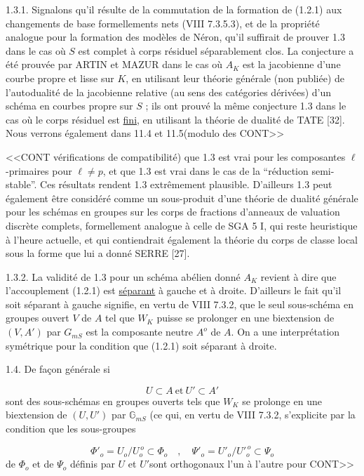 1.3.1. Signalons qu'il résulte de la commutation de la formation de (1.2.1) aux changements de base formellements nets (VIII 7.3.5.3), et de la propriété analogue pour la formation des modèles de Néron, qu'il suffirait de prouver 1.3 dans le cas où $S$ est complet à corps résiduel séparablement clos. La conjecture a été prouvée par ARTIN et MAZUR dans le cas où $A_K$ est la jacobienne d'une courbe propre et lisse sur $K$, en utilisant leur théorie générale (non publiée) de l'autodualité de la jacobienne relative (au sens des catégories dérivées) d'un schéma en courbes propre sur $S$ ; ils ont prouvé la même conjecture 1.3 dans le cas où le corps résiduel est \underline{fini}, en utilisant la théorie de dualité de TATE [32]. Nous verrons également dans 11.4 et 11.5(modulo des CONT>>



<<CONT vérifications de compatibilité) que 1.3 est vrai pour les composantes $\ell$-primaires pour $\ell \neq p$, et que 1.3 est vrai dans le cas de la ``réduction semi-stable''. Ces résultats rendent 1.3 extrêmement plausible. D'ailleurs 1.3 peut également être considéré comme un sous-produit d'une théorie de dualité générale pour les schémas en groupes sur les corps de fractions d'anneaux de valuation discrète complets, formellement analogue à celle de SGA 5 I, qui reste heuristique à l'heure actuelle, et qui contiendrait également la théorie du corps de classe local sous la forme que lui a donné SERRE [27].

1.3.2. La validité de 1.3 pour un schéma abélien donné $A_K$ revient à dire que l'accouplement (1.2.1) est \underline{séparant} à gauche et à droite. D'ailleurs le fait qu'il soit séparant à gauche signifie, en vertu de VIII 7.3.2, que le seul sous-schéma en groupes ouvert $V$ de $A$ tel que $W_K$ puisse se prolonger en une biextension de $(V,A')$ par $G_{mS}$ est la composante neutre $A^o$ de $A$. On a une interprétation symétrique pour la condition que (1.2.1) soit séparant à droite.

1.4. De façon générale si

\begin{equation}\tag{1.4.1}
U \subset A \ \mbox{et} \ U' \subset A'
\end{equation}
sont des sous-schémas en groupes ouverts tels que $W_K$ se prolonge en une biextension de $(U,U')$ par $\mathbb{G}_{mS}$ (ce qui, en vertu de VIII 7.3.2, s'explicite par la condition que les sous-groupes

\begin{equation}\tag{1.4.2}
\Phi'_o = U_o/U_o^{\,o} \subset \Phi_o \quad , \quad \Psi'_o = {U'}_o/{U'}_o^{\,o} \subset \Psi_o
\end{equation}
de $\Phi_o$ et de $\Psi_o$ définis par $U$ et $U'$sont orthogonaux l'un à l'autre pour CONT>>


